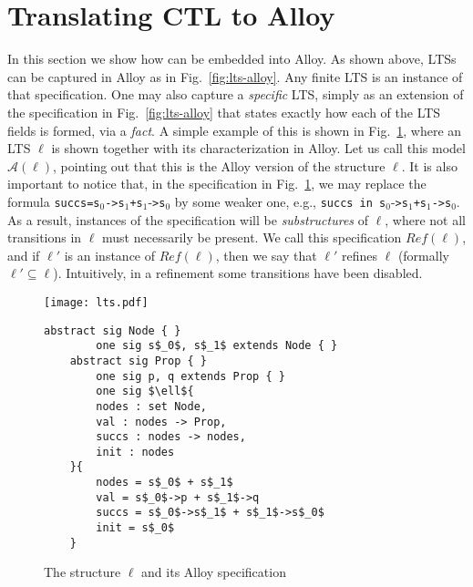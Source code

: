 \section{Translating CTL to Alloy}\label{sec:ctl-alloy}

In this section we show how \ctl{} can be embedded into Alloy. As shown above, LTSs can be captured in Alloy as in Fig.~\ref{fig:lts-alloy}. Any finite LTS is an instance of that specification. One may also capture a \emph{specific} LTS, simply as an extension of the specification in Fig.~\ref{fig:lts-alloy} that states exactly how each of the LTS fields is formed, via a \emph{fact}. A simple example of this is shown in Fig.~\ref{fig:lts-alloy2}, where an LTS $\ell$ is shown together with its characterization in Alloy. Let us call this model $\mathcal{A}(\ell)$, %
pointing out that this is the Alloy version of the structure $\ell$. 
It is also important to notice that, in the specification in Fig.~\ref{fig:lts-alloy2}, we may replace the formula \verb"succs=s"$_0$\verb"->s"$_1$\verb"+s"$_1$-\verb">s"$_0$ by some weaker one, e.g., \verb"succs in s"$_0$-\verb">s"$_1$\verb"+s"$_1$\verb"->s"$_0$. As a result, instances of the specification will be \emph{substructures} of $\ell$, where not all transitions in $\ell$ must necessarily be present. We call this specification $Ref(\ell)$, and if $\ell'$ is an instance of $Ref(\ell)$, then we say that $\ell'$ refines $\ell$ (formally $\ell' \subseteq \ell$). Intuitively, in a refinement some transitions have been disabled. %

\begin{figure}[t]
    \centering
    \begin{minipage}{0.5\linewidth}
        \centering
         \texttt{[image: lts.pdf]}
    \end{minipage}%
    \begin{minipage}{0.5\linewidth} 
        \centering
        \begin{lstlisting}[style=Alloy,basicstyle=\tiny,mathescape=true]
	abstract sig Node { }
        one sig s$_0$, s$_1$ extends Node { }
	abstract sig Prop { }
        one sig p, q extends Prop { }
        one sig $\ell${
		nodes : set Node,
		val : nodes -> Prop,
		succs : nodes -> nodes,
		init : nodes
	}{
		nodes = s$_0$ + s$_1$
		val = s$_0$->p + s$_1$->q
		succs = s$_0$->s$_1$ + s$_1$->s$_0$
		init = s$_0$
	}
	\end{lstlisting}
    \end{minipage}
    \caption{The structure $\ell$ and its Alloy specification}\label{fig:lts-alloy2}
\end{figure}

